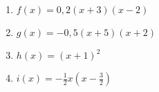 \begin{Exercise}[title={Bestimme die Nullstellen und skizziere das Schaubild}, label=produktformNullstellenA2]

	\begin{minipage}{\textwidth}
		\begin{minipage}{0.5\textwidth}
			\begin{enumerate}[label=\alph*)]
				\item \(f(x)=0,2\left(x+3\right)\left(x-2\right)\)
				\item \(g(x)=-0,5\left(x+5\right)\left(x+2\right)\)
			\end{enumerate}
		\end{minipage}%
		\begin{minipage}{0.5\textwidth}
			\begin{enumerate}[label=\alph*)]
				\setcounter{enumi}{2}
				\item \(h(x)=\left(x+1\right)^2\)
				\item \(i(x)=-\frac{1}{2}x\left(x-\frac{3}{2}\right)\)
			\end{enumerate}
		\end{minipage}%
	\end{minipage}%
\end{Exercise}

